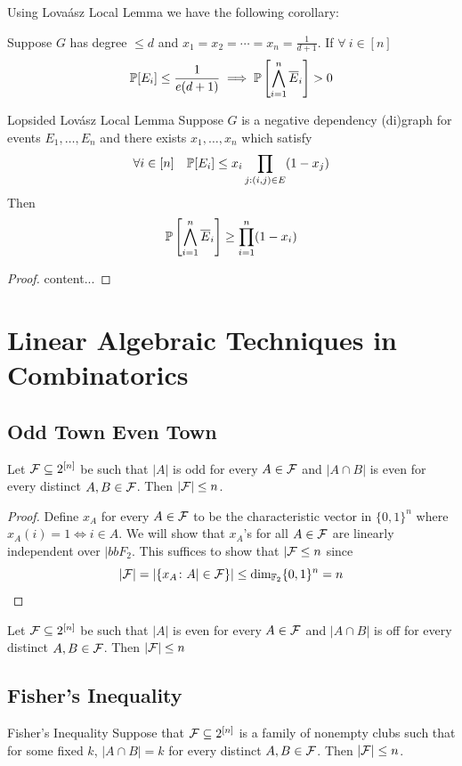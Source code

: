 Using Lova\'{a}sz Local Lemma we have the following corollary:
\begin{corolary}{}{}
	Suppose $G$ has degree $\leq d$ and $x_1=x_2=\cdots=x_n=\frac1{d+1}$. If $\forall\ i\in[n]$ $$\mathbb{P}[E_i]\leq\frac{1}{e(d+1)}\implies \mathbb{P}\left[\bigwedge_{i=1}^n\overline{E}_i\right]>0$$
\end{corolary}
\begin{Theorem}{Lopsided Lov\'{a}sz Local Lemma}{}
	Suppose $G$ is a negative dependency (di)graph for events $E_1,\dots, E_n$ and there exists $x_1,\dots, x_n$ which satisfy $$\forall i\in[n]\quad \mathbb{P}[E_i]\leq x_i\prod_{j:(i,j)\in E}(1-x_j)$$Then $$\mathbb{P}\left[\bigwedge_{i=1}^n\overline{E}_i\right]\geq \prod_{i=1}^n(1-x_i)$$
\end{Theorem}
\begin{proof}
	content...
\end{proof}
\section{Linear Algebraic Techniques in Combinatorics}
\subsection{Odd Town Even Town}
\begin{lemma}{}{}
	Let $\mathcal{F}\subseteq 2^{[n]}$ be such that $|A|$ is odd for every $A\in \mathcal{F}$ and $|A\cap B|$ is even for every distinct $A,B\in \mathcal{F}$. Then $|\mathcal{F}|\leq n$.
\end{lemma}
\begin{proof}
	Define $x_A$ for every $A\in \mathcal{F}$ to be the characteristic vector in $\{0,1\}^n$ where $x_A(i)=1\iff i\in A$. We will show that $x_A$'s for all $A\in\mathcal{F}$ are linearly independent over $|bbF_2$. This suffices to show that $|\mathcal{F}\leq n$ since $$|\mathcal{F}|=|\{x_A\colon A|\in\mathcal{F}\}|\leq \dim_{\mathbb{F}_2} \{0,1\}^n=n$$
\end{proof}
\begin{lemma}{}{}
	Let $\mathcal{F}\subseteq 2^{[n]}$ be such that $|A|$ is even for every $A\in \mathcal{F}$ and $|A\cap B|$ is off for every distinct $A,B\in \mathcal{F}$. Then $|\mathcal{F}|\leq n$
\end{lemma}
\subsection{Fisher's Inequality}
\begin{Theorem}{Fisher's Inequality}{}
	Suppose that $\mathcal{F}\subseteq 2^{[n]}$ is a family of nonempty clubs such that for some fixed $k$, $|A\cap B|=k$ for every distinct $A,B\in \mathcal{F}$. Then $|\mathcal{F}|\leq n$.
\end{Theorem}
